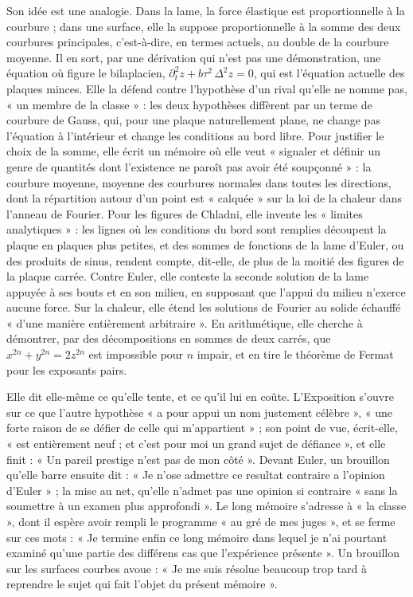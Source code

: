 \documentclass[11pt,a4paper]{article}
\begin{document}
\begin{resume}
Son idée est une analogie. Dans la lame, la force élastique est proportionnelle à
la courbure ; dans une surface, elle la suppose proportionnelle à la somme des
deux courbures principales, c'est-à-dire, en termes actuels, au double de la
courbure moyenne. Il en sort, par une dérivation qui n'est pas une
démonstration, une équation où figure le bilaplacien,
$\partial_t^2 z + b\tau^2\,\Delta^2 z = 0$, qui est l'équation actuelle des plaques
minces. Elle la défend contre l'hypothèse d'un rival qu'elle ne nomme pas, « un
membre de la classe » : les deux hypothèses diffèrent par un terme de courbure de
Gauss, qui, pour une plaque naturellement plane, ne change pas l'équation à
l'intérieur et change les conditions au bord libre. Pour justifier le choix de la somme, elle écrit un
mémoire où elle veut « signaler et définir un genre de quantités dont l'existence
ne paroît pas avoir été soupçonné » : la courbure moyenne, moyenne des courbures
normales dans toutes les directions, dont la répartition autour d'un point est
« calquée » sur la loi de la chaleur dans l'anneau de Fourier. Pour les figures de
Chladni, elle invente les « limites analytiques » : les lignes où les conditions du
bord sont remplies découpent la plaque en plaques plus petites, et des sommes de
fonctions de la lame d'Euler, ou des produits de sinus, rendent compte, dit-elle,
de plus de la moitié des figures de la plaque carrée. Contre Euler, elle conteste
la seconde solution de la lame appuyée à ses bouts et en son milieu, en supposant
que l'appui du milieu n'exerce aucune force. Sur la chaleur, elle étend les solutions de Fourier au
solide échauffé « d'une manière entièrement arbitraire ». En arithmétique, elle
cherche à démontrer, par des décompositions en sommes de deux carrés, que
$x^{2n}+y^{2n}=2z^{2n}$ est impossible pour $n$ impair, et en tire le théorème de
Fermat pour les exposants pairs.

Elle dit elle-même ce qu'elle tente, et ce qu'il lui en coûte. L'Exposition
s'ouvre sur ce que l'autre hypothèse « a pour appui un nom justement célèbre »,
« une forte raison de se défier de celle qui m'appartient » ; son point de vue,
écrit-elle, « est entièrement neuf ; et c'est pour moi un grand sujet de
défiance », et elle finit : « Un pareil prestige n'est pas de mon côté ». Devant
Euler, un brouillon qu'elle barre ensuite dit : « Je n'ose admettre ce resultat
contraire a l'opinion d'Euler » ; la mise au net, qu'elle n'admet pas une opinion
si contraire « sans la soumettre à un examen plus approfondi ». Le long mémoire
s'adresse à « la classe », dont il espère avoir rempli le programme « au gré de mes
juges », et se ferme sur ces mots : « Je termine enfin ce long mémoire dans lequel
je n'ai pourtant examiné qu'une partie des différens cas que l'expérience
présente ». Un brouillon sur les surfaces courbes avoue : « Je me suis résolue
beaucoup trop tard à reprendre le sujet qui fait l'objet du présent mémoire ».


\end{resume}
\end{document}
